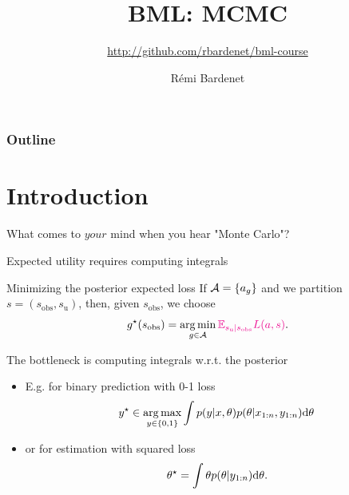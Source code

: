 \documentclass[10pt]{beamer}
\title[Bayesian ML: Bayesics]{BML: MCMC}
\subtitle{\url{http://github.com/rbardenet/bml-course}}
\author[Rémi Bardenet (CNRS \& Univ. Lille)] %
{Rémi Bardenet}
\institute[] %
{
  CNRS \& CRIStAL, Univ. Lille, France\\
\vspace{1cm}
\texttt{[image: /Users/rbardenet/Work/Tex/PosterImages/logoCNRS.pdf]}
\qquad \texttt{[image: /Users/rbardenet/Work/Tex/PosterImages/cristalLogo.pdf]}
}
\date{}
\renewcommand\un[1]{\textcolor{magenta}{#1}}
\begin{document}
\begin{frame}
\maketitle
\end{frame}

\begin{frame}
\frametitle{Outline}
\tableofcontents
\end{frame}

\section{Introduction}

\begin{frame}{What comes to $your$ mind when you hear "Monte Carlo"?}
\end{frame}

\begin{frame}{Expected utility requires computing integrals}
  \begin{block}{Minimizing the posterior expected loss}
  If $\mathcal{A}= \{a_g\}$ and we partition $s=(s_{\text{obs}}, s_{\text{u}})$, then, given $s_\text{obs}$, we choose
  $$
  g^\star(s_\text{obs}) = \argmin_{g\in\mathcal{A}} \un{\mathbb{E}_{s_{\text{u}}\vert s_{\text{obs}}} L(a,s)}.
  $$
\end{block}

  \begin{alertblock}{The bottleneck is computing integrals w.r.t. the posterior}
  \begin{itemize}
    \item E.g. for binary prediction with 0-1 loss
    $$
    y^\star \in \operatorname*{arg\,max}_{y\in\{0,1\}} \int p(y\vert x,\theta) p(\theta\vert x_{1:n}, y_{1:n}) {\rm d}\theta
    $$
    \item or for estimation with squared loss
    $$
    \theta^\star = \int \theta p(\theta\vert y_{1:n}) {\rm d}\theta.
    $$
  \end{itemize}
\end{alertblock}
\end{frame}
\end{document}
